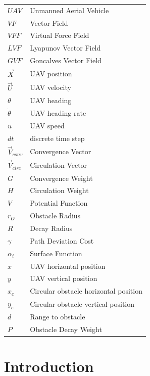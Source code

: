 \documentclass[conf]{new-aiaa}
\begin{document}
{\renewcommand\arraystretch{1.0}
\noindent\begin{longtable*}{@{}l @{\quad=\quad} l@{}}
$UAV$  & Unmanned Aerial Vehicle \\
$VF$   & Vector Field \\
$VFF$  & Virtual Force Field \\
$LVF$  & Lyapunov Vector Field \\
$GVF$  & Goncalves Vector Field \\
$\overrightarrow{X}$  & UAV position \\
$\overrightarrow{U}$  & UAV velocity \\
$\theta$  & UAV heading \\
$\dot{\theta}$  & UAV heading rate \\
$u$  & UAV speed \\
$dt$  & discrete time step\\


$\overrightarrow{V}_{conv}$  & Convergence Vector\\
$\overrightarrow{V}_{circ}$  & Circulation Vector\\

$G$  & Convergence Weight\\
$H$  & Circulation Weight\\
$V$  & Potential Function\\

$r_O$  & Obstacle Radius\\
$R$  & Decay Radius\\
$\gamma$  & Path Deviation Cost\\
$\alpha_i$  & Surface Function\\

$x$  & UAV horizontal position\\
$y$  & UAV vertical position\\

$x_c$  & Circular obstacle horizontal position\\
$y_c$  & Circular obstacle vertical position\\

$d$  & Range to obstacle\\

$P$  & Obstacle Decay Weight\\




\end{longtable*}}

\section{Introduction}
\end{document}
